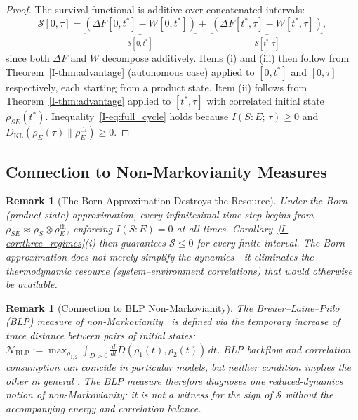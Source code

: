 \documentclass[12pt,a4paper,openany]{book}
\newtheorem{remark}[theorem]{Remark}
\begin{document}
\begin{proof}
The survival functional is additive over concatenated
intervals:
\[
\mathcal{S}[0,\tau]
= \underbrace{(\Delta F[0,t^*] - W[0,t^*])}_{\mathcal{S}[0,t^*]}
  +\; \underbrace{(\Delta F[t^*,\tau] - W[t^*,\tau])}_{\mathcal{S}[t^*,\tau]},
\]
since both $\Delta F$ and $W$ decompose additively.
Items (i) and (iii) then follow from
Theorem~\ref{I-thm:advantage} (autonomous case) applied to
$[0,t^*]$ and $[0,\tau]$ respectively, each starting from
a product state.
Item (ii) follows from Theorem~\ref{I-thm:advantage} applied
to $[t^*,\tau]$ with correlated initial state
$\rho_{SE}(t^*)$.
Inequality~\eqref{I-eq:full_cycle} holds because
$I(S{:}E;\,\tau) \geq 0$ and
$D_{\mathrm{KL}}(\rho_E(\tau)\|\rho_E^{\mathrm{th}}) \geq 0$.
\end{proof}

\subsection{Connection to Non-Markovianity Measures}

\begin{remark}[The Born Approximation Destroys the Resource]
\label{I-rem:born_kills}
Under the Born (product-state) approximation, every
infinitesimal time step begins from
$\rho_{SE} \approx \rho_S \otimes \rho_E^{\mathrm{th}}$,
enforcing $I(S{:}E) = 0$ at all times.
Corollary~\ref{I-cor:three_regimes}(i) then guarantees
$\mathcal{S} \leq 0$ for \emph{every} finite interval.
The Born approximation does not merely simplify the
dynamics---it \emph{eliminates the thermodynamic resource}
(system--environment correlations) that would otherwise be
available.
\end{remark}

\begin{remark}[Connection to BLP Non-Markovianity]
\label{I-rem:BLP}
The Breuer--Laine--Piilo (BLP) measure of
non-Markovianity~\cite{BreuerLainePiilo2009} is defined via
the temporary increase of trace distance between pairs of
initial states:
$\mathcal{N}_{\mathrm{BLP}} := \max_{\rho_{1,2}}
\int_{\dot{D}>0} \frac{d}{dt}
D(\rho_1(t),\rho_2(t))\, dt$.
BLP backflow and correlation consumption can coincide in particular
models, but neither condition implies the other in general
\cite{RivasHuelgaPlenio2014}.  The BLP measure therefore diagnoses one
reduced-dynamics notion of non-Markovianity; it is not a witness for the
sign of $\mathcal S$ without the accompanying energy and correlation
balance.
\end{remark}
\end{document}

